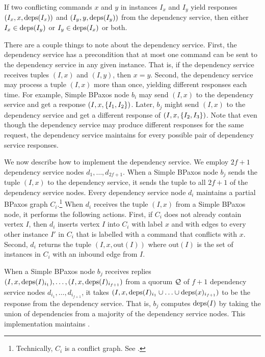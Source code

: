 \begin{invariant}
If two conflicting commands $x$ and $y$ in instances $I_x$ and $I_y$ yield
responses $(I_x, x, \text{deps}(I_x))$ and $(I_y, y, \text{deps}(I_y))$ from the dependency
service, then either $I_x \in \text{deps}(I_y)$ or $I_y \in \text{deps}(I_x)$ or both.
\end{invariant}

There are a couple things to note about the dependency service.
%
First, the dependency service has a precondition that at most one command can
be sent to the dependency service in any given instance. That is, if the
dependency service receives tuples $(I, x)$ and $(I, y)$, then $x = y$.
%
Second, the dependency service may process a tuple $(I, x)$ more than once,
yielding different responses each time. For example, Simple BPaxos node $b_i$
may send $(I, x)$ to the dependency service and get a response $(I, x,
\{I_1, I_2\})$. Later, $b_j$ might send $(I, x)$ to the dependency service
and get a different response of $(I, x, \{I_2, I_3\})$. Note that even though
the dependency service may produce different responses for the same request,
the dependency service maintains  for every possible
pair of dependency service responses.

\newcommand{\out}[1]{\text{out}(#1)}
We now describe how to implement the dependency service. We employ $2f + 1$
dependency service nodes $d_{1}, \ldots, d_{2f + 1}$. When a Simple BPaxos node
$b_j$ sends the tuple $(I, x)$ to the dependency service, it sends the tuple to
all $2f + 1$ of the dependency service nodes. Every dependency service node
$d_i$ maintains a partial BPaxos graph $C_i$.\footnote{Technically, $C_i$ is a
conflict graph. See .} When $d_i$ receives the
tuple $(I, x)$ from a Simple BPaxos node, it performs the following actions.
%
First, if $C_i$ does not already contain vertex $I$, then $d_i$ inserts vertex
$I$ into $C_i$ with label $x$ and with edges to every other instance $I'$ in
$C_i$ that is labelled with a command that conflicts with $x$.
%
Second, $d_i$ returns the tuple $(I, x, \out{I})$ where $\out{I}$ is the set of
instances in $C_i$ with an inbound edge from $I$.

When a Simple BPaxos node $b_j$ receives replies $(I, x, \text{deps}(I)_{i_1}),
\ldots, (I, x, \text{deps}(I)_{i_{f+1}})$ from a quorum $\mathcal{Q}$ of $f + 1$
dependency service nodes $d_{i_1}, \ldots, d_{i_{f+1}}$, it takes $(I, x,
\text{deps}(I)_{i_1} \cup \ldots \cup \text{deps}(x)_{i_{f+1}})$ to be the response from
the dependency service. That is, $b_j$ computes $\text{deps}(I)$ by taking the union
of dependencies from a majority of the dependency service nodes.
%
This implementation maintains .

